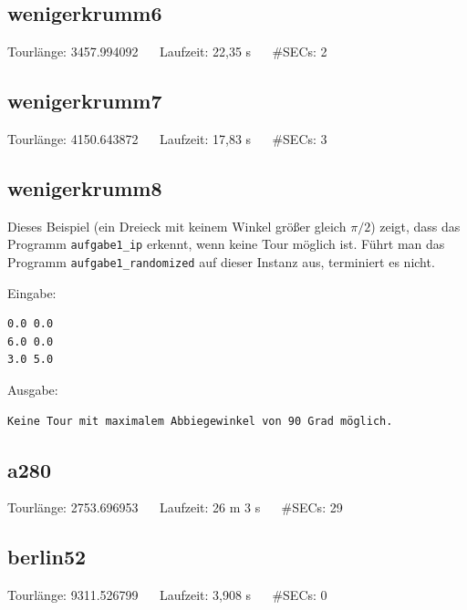 \documentclass[a4paper, 10pt, ngerman]{article}
\begin{document}
\subsection{wenigerkrumm6}



\noindent Tourlänge: 3457.994092 $\quad$ Laufzeit: 22,35 s $\quad$ \#SECs: 2

\subsection{wenigerkrumm7}



\noindent Tourlänge: 4150.643872 $\quad$ Laufzeit: 17,83 s $\quad$ \#SECs: 3

\subsection{wenigerkrumm8}

Dieses Beispiel (ein Dreieck mit keinem Winkel größer gleich $\pi / 2$) zeigt, dass das Programm \verb|aufgabe1_ip| erkennt, wenn keine Tour möglich ist. Führt man das Programm \verb|aufgabe1_randomized| auf dieser Instanz aus, terminiert es nicht.
\medskip

\noindent Eingabe:
\begin{verbatim}
0.0 0.0
6.0 0.0
3.0 5.0
\end{verbatim}

\noindent Ausgabe:
\begin{verbatim}
Keine Tour mit maximalem Abbiegewinkel von 90 Grad möglich.
\end{verbatim}

\subsection{a280}



\noindent Tourlänge: 2753.696953 $\quad$ Laufzeit: 26 m 3 s $\quad$ \#SECs: 29

\subsection{berlin52}



\noindent Tourlänge: 9311.526799 $\quad$ Laufzeit: 3,908 s $\quad$ \#SECs: 0
\end{document}
